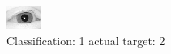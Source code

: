 \begin{figure}[h!]
\begin{center}
\includegraphics[width=0.60\columnwidth]{figures/ID3088_class_1_target_2.png}
\end{center}
\caption{ Classification: 1 actual target: 2}
\label{fig:ID3088_class_1_target_2}
\end{figure}
